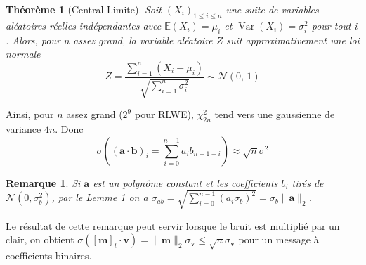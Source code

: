 \documentclass[11pt, headsepline, a4paper, fleqn, oneside]{article}
\newtheorem{theo}{Théorème}
\newtheorem{rem}{Remarque}
\begin{document}
\begin{theo}[Central Limite]
Soit $(X_i)_{1\leq i\leq n}$ une suite de variables aléatoires réelles indépendantes avec $\mathbb{E}(X_i)=\mu_i$ et $\operatorname{Var}(X_i) = \sigma_i ^2$ pour tout $i$. Alors, pour $n$ assez grand, la variable aléatoire $Z$ suit approximativement une loi normale $$Z=\frac{\sum_{i=1}^{n}\left(X_{i}-\mu_{i}\right)}{\sqrt{\sum_{i=1}^{n} \sigma_{i}^{2}}} \sim \mathcal{N}(0,\,1)$$
\end{theo}
Ainsi, pour $n$ assez grand ($2^9$ pour RLWE), $\chi^2 _{2n}$ tend vers une gaussienne de variance $4n$. Donc $$\sigma\left((\boldsymbol{a}\cdot \boldsymbol{b})_i = \sum_{i=0}^{n-1} a_{i} b_{n-1-i}\right) \approx \sqrt{n} \sigma^{2}$$
\begin{rem}\label{rem7}
Si $\boldsymbol{a}$ est un polynôme constant et les coefficients $b_i$ tirés de $\mathcal{N}(0, \sigma_b ^2)$, par le Lemme 1 on a $\sigma_{ab} =\sqrt{\sum_{i=0}^{n-1} (a_{i} \sigma_b)^2} = \sigma_b \|\boldsymbol{a}\|_2$.
\end{rem}
Le résultat de cette remarque peut servir lorsque le bruit est multiplié par un clair, on obtient $\sigma([\boldsymbol{m}]_t \cdot\boldsymbol{v}) = \|\boldsymbol{m}\|_2\sigma_{\boldsymbol{v}} \leq \sqrt{n} \sigma_{\boldsymbol{v}}$ pour un message à coefficients binaires.\\
\end{document}
